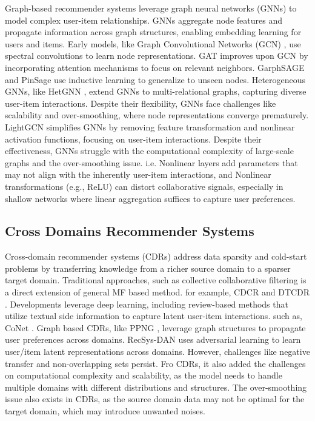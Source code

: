 Graph-based recommender systems leverage graph neural networks (GNNs) to model complex user-item relationships. GNNs aggregate node features and propagate information across graph structures, enabling embedding learning for users and items. Early models, like Graph Convolutional Networks (GCN) \cite{kipf2016semi}, use spectral convolutions to learn node representations. GAT \cite{veličković2018graphattentionnetworks} improves upon GCN by incorporating attention mechanisms to focus on relevant neighbors. GarphSAGE \cite{hamilton2017inductive} and PinSage \cite{pal2020pinnersage} use inductive learning to generalize to unseen nodes. Heterogeneous GNNs, like HetGNN \cite{shi2018heterogeneous}, extend GNNs to multi-relational graphs, capturing diverse user-item interactions. Despite their flexibility, GNNs face challenges like scalability and over-smoothing, where node representations converge prematurely.
LightGCN \cite{he2020lightgcn} simplifies GNNs by removing feature transformation and nonlinear activation functions, focusing on user-item interactions.
Despite their effectiveness, GNNs struggle with the computational complexity of large-scale graphs and the over-smoothing issue. i.e. Nonlinear layers add parameters that may not align with the inherently user-item interactions, and Nonlinear transformations (e.g., ReLU) can distort collaborative signals\cite{Wei2021EffectsON}, especially in shallow networks where linear aggregation suffices to capture user preferences. \cite{Sharma2023ExperimentalHA}


\subsection{Cross Domains Recommender Systems}

Cross-domain recommender systems (CDRs) address data sparsity and cold-start problems by transferring knowledge from a richer source domain to a sparser target domain.
Traditional approaches, such as collective collaborative filtering is a direct extension of general MF based method. for example, CDCR \cite{rafailidis2017collaborative} and DTCDR \cite{DTCDR2019zhu}. Developments leverage deep learning, including review-based methods that utilize textual side information to capture latent user-item interactions. such as, CoNet \cite{Hu_2018}.
Graph based CDRs, like PPNG \cite{zhao2019cross}, leverage graph structures to propagate user preferences across domains. RecSys-DAN uses adversarial learning to learn user/item latent representations across domains.\cite{wang2019recsys}
However, challenges like negative transfer and non-overlapping sets persist. Fro CDRs, it also added the challenges on computational complexity and scalability, as the model needs to handle multiple domains with different distributions and structures. The over-smoothing issue also exists in CDRs, as the source domain data may not be optimal for the target domain, which may introduce unwanted noises.
